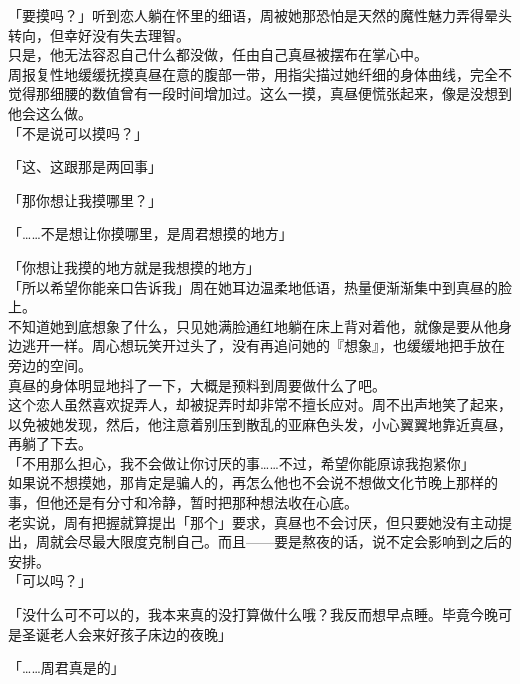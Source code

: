 「要摸吗？」听到恋人躺在怀里的细语，周被她那恐怕是天然的魔性魅力弄得晕头转向，但幸好没有失去理智。\\

只是，他无法容忍自己什么都没做，任由自己真昼被摆布在掌心中。\\

周报复性地缓缓抚摸真昼在意的腹部一带，用指尖描过她纤细的身体曲线，完全不觉得那细腰的数值曾有一段时间增加过。这么一摸，真昼便慌张起来，像是没想到他会这么做。\\

「不是说可以摸吗？」

「这、这跟那是两回事」

「那你想让我摸哪里？」

「……不是想让你摸哪里，是周君想摸的地方」

「你想让我摸的地方就是我想摸的地方」\\

「所以希望你能亲口告诉我」周在她耳边温柔地低语，热量便渐渐集中到真昼的脸上。\\

不知道她到底想象了什么，只见她满脸通红地躺在床上背对着他，就像是要从他身边逃开一样。周心想玩笑开过头了，没有再追问她的『想象』，也缓缓地把手放在旁边的空间。\\

真昼的身体明显地抖了一下，大概是预料到周要做什么了吧。\\

这个恋人虽然喜欢捉弄人，却被捉弄时却非常不擅长应对。周不出声地笑了起来，以免被她发现，然后，他注意着别压到散乱的亚麻色头发，小心翼翼地靠近真昼，再躺了下去。\\

「不用那么担心，我不会做让你讨厌的事……不过，希望你能原谅我抱紧你」\\

如果说不想摸她，那肯定是骗人的，再怎么他也不会说不想做文化节晚上那样的事，但他还是有分寸和冷静，暂时把那种想法收在心底。\\

老实说，周有把握就算提出「那个」要求，真昼也不会讨厌，但只要她没有主动提出，周就会尽最大限度克制自己。而且——要是熬夜的话，说不定会影响到之后的安排。\\

「可以吗？」

「没什么可不可以的，我本来真的没打算做什么哦？我反而想早点睡。毕竟今晚可是圣诞老人会来好孩子床边的夜晚」

「……周君真是的」\\

